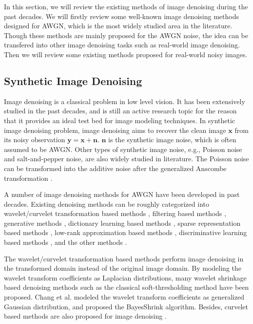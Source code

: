 In this section, we will review the existing methods of image denoising during the past decades. We will firstly review some well-known image denoising methods designed for AWGN, which is the most widely studied area in the literature. Though these methods are mainly proposed for the AWGN noise, the idea can be transfered into other image denoising tasks such as real-world image denoising. Then we will review some existing methods proposed for real-world noisy images.

\subsection{Synthetic Image Denoising}
\label{sec:review:sys}

Image denoising is a classical problem in low level vision. It has been extensively studied in the past decades, and is still an active research topic for the reason that it provides an ideal test bed for image modeling techniques. In synthetic image denoising problem, image denoising aims to recover the clean image $\mathbf{x}$ from its noisy observation $\mathbf{y} = \mathbf{x} + \mathbf{n}$. $\mathbf{n}$ is the synthetic image noise, which is often assumed to be AWGN. Other types of synthetic image noise, e.g., Poisson noise and salt-and-pepper noise, are also widely studied in literature. The Poisson noise can be transformed into the additive noise after the generalized Anscombe transformation \cite{makitalo2013optimal}.

A number of image denoising methods for AWGN have been developed in past decades. Existing denoising methods can be roughly categorized into wavelet/curvelet transformation based methods \cite{softthresholding,bayesshrink,curvelet}, filtering based methods \cite{Tomasi1998,blsgsm,ple,nlm}, generative methods \cite{foe,epll,gmmnips}, dictionary learning based methods \cite{ksvd,ksvdtsp,srcolor,onlinedl}, sparse representation based methods \cite{bm3d,lssc,ncsr}, low-rank approximation based methods \cite{nnm,wnnm}, discriminative learning based methods \cite{mlp,csf,tnrd,dncnn}, and the other methods \cite{PeronaMalik1990,rudin1992nonlinear,osher2005iterative}.

The wavelet/curvelet transformation based methods perform image denoising in the transformed domain instead of the original image domain. By modeling the wavelet transform coefficients as Laplacian distributions, many wavelet shrinkage based denoising methods such as the classical soft-thresholding method \cite{softthresholding} have been proposed. Chang et al. modeled the wavelet transform coefficients as generalized Gaussian distribution, and proposed the BayesShrink \cite{bayesshrink} algorithm. Besides, curvelet based methods are also proposed for image denoising \cite{curvelet}.

